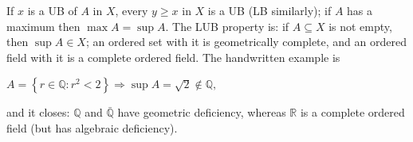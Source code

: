 If \(x\) is a UB of \(A\) in \(X\), every \(y \geq x\) in \(X\) is a UB (LB similarly); if \(A\) has a maximum then \(\max A = \sup A\). The LUB property is: if \(A \subseteq X\) is not empty, then \(\sup A \in X\); an ordered set with it is geometrically complete, and an ordered field with it is a complete ordered field. The handwritten example is

\(A = \left\{ {r \in \mathbb{Q}:r^{2} < 2} \right\}\Rightarrow\sup A = \sqrt{2} \notin \mathbb{Q},\)

and it closes: \(\mathbb{Q}\) and \(\bar{\mathbb{Q}}\) have geometric deficiency, whereas \(\mathbb{R}\) is a complete ordered field (but has algebraic deficiency).
